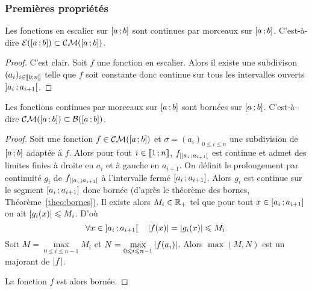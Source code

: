 \subsubsection{Premières propriétés}

\begin{prop}
  Les fonctions en escalier sur \(\left[ a \, ; {} b \right]\) sont continues par
  morceaux sur \(\left[ a \, ; {} b \right]\). C'est-à-dire \(\mathcal{E}(\left[ a \, ; {} b \right])
  \subset \mathcal{CM}(\left[ a \, ; {} b \right])\).
\end{prop}
\begin{proof}
  C'est clair. Soit \(f\) une fonction en escalier. Alors il existe une
  subdivison \((a_i)_{i \in \mathopen{\llbracket}0\mathclose{}\mathpunct{};n\mathclose{\rrbracket}}\) telle que \(f\) soit
  constante donc continue sur tous les intervalles ouverts
  \(\left] a_i \, ; {} a_{i+1} \right[\).
\end{proof}

\begin{prop}
  Les fonctions continues par morceaux sur \(\left[ a \, ; {} b \right]\) sont bornées
  sur \(\left[ a \, ; {} b \right]\). C'est-à-dire \(\mathcal{CM}(\left[ a \, ; {} b \right]) \subset
  \mathcal{B}(\left[ a \, ; {} b \right])\).
\end{prop}
\begin{proof}
  Soit une fonction \(f \in \mathcal{CM}(\left[ a \, ; {} b \right])\) et \(\sigma=(a_i)_{0
  \leqslant i \leqslant n}\) une subdivision de \(\left[ a \, ; {} b \right]\) adaptée
  à \(f\). Alors pour tout \(i \in \mathopen{\llbracket}1\mathclose{}\mathpunct{};n\mathclose{\rrbracket}\),
  \(f_{|\left] a_i \, ; {} a_{i+1} \right[}\) est continue et admet des limites finies
  à droite en \(a_{i}\) et à gauche en \(a_{i+1}\). On définit le prolongement
  par continuité \(g_i\) de \(f_{|\left] a_i \, ; {} a_{i+1} \right[}\) à l'intervalle
  fermé \(\left[ a_i \, ; {} a_{i+1} \right]\). Alors \(g_i\) est continue sur le
  segment \(\left[ a_i \, ; {} a_{i+1} \right]\) donc bornée (d'après le théorème des
  bornes, Théorème~\ref{theo:bornes}). Il existe alors \(M_i \in \mathbb{R}_+\) tel que pour tout \(x \in
  \left[ a_i \, ; {} a_{i+1} \right] \) on ait \(\left\lvert g_i(x)\right\rvert \leqslant M_i\). D'où
  \begin{equation}
    \forall x \in \left] a_i \, ; {} a_{i+1} \right[ \quad \left\lvert f(x)\right\rvert=\left\lvert g_i(x)\right\rvert
    \leqslant M_i.
  \end{equation}
  Soit \(M=\max\limits_{0 \leqslant i \leqslant n-1} M_i\) et \(N=\max\limits_{0
  \leqslant i \leqslant n-1} \left\lvert f(a_i)\right\rvert\). Alors \(\max(M,N)\) est un majorant
  de \(\left\lvert f\right\rvert\).

  La fonction \(f\) est alors bornée.
\end{proof}

